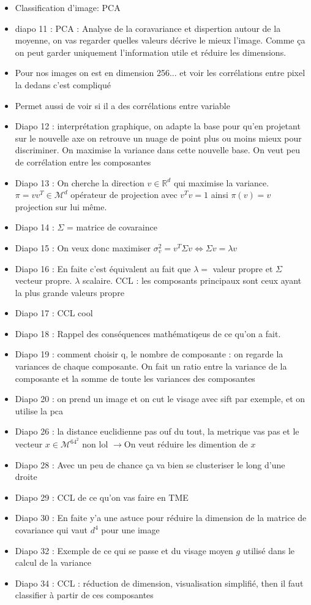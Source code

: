 \documentclass{article}
\theoremstyle{plain}%
\theoremstyle{definition}
\theoremstyle{remark}
\begin{document}
\begin{itemize}
    \item Classification d'image: PCA 
    \item diapo 11 : PCA : Analyse de la coravariance et dispertion autour de la moyenne, on vas regarder quelles valeurs décrive le mieux l'image. Comme ça on peut garder uniquement l'information utile et réduire les dimensions.
    \item Pour nos images on est en dimension 256... et voir les corrélations entre pixel la dedans c'est compliqué 
    \item Permet aussi de voir si il a des corrélations entre variable
    \item Diapo 12 : interprétation graphique, on adapte la base pour qu'en projetant sur le nouvelle axe on retrouve un nuage de point plus ou moins mieux pour discriminer. On maximise la variance dans cette nouvelle base. On veut peu de corrélation entre les composantes 
    \item Diapo 13 : On cherche la direction $ v \in \mathbb{R}^d$ qui maximise la variance. $ \pi = v v^T \in \mathcal{M}^d $ opérateur de projection avec $ v^T v = 1 $ ainsi $ \pi (v) = v $  projection sur lui même.
    \item Diapo 14 : $ \Sigma  $ = matrice de covaraince 
    \item Diapo 15 : On veux donc maximiser $ \sigma _v ^2 = v^T \Sigma v \Leftrightarrow \Sigma v = \lambda v$ 
    \item Diapo 16 : En faite c'est équivalent au fait que $ \lambda  = $ valeur propre et $ \Sigma  $ vecteur propre. $ \lambda  $ scalaire. CCL : les composants principaux sont ceux ayant la plus grande valeurs propre 
    \item Diapo 17 : CCL cool
    \item Diapo 18 : Rappel des conséquences mathématiqeus de ce qu'on a fait.
    \item Diapo 19 : comment choisir q, le nombre de composante : on regarde la variances de chaque composante. On fait un ratio entre la variance de la composante et la somme de toute les variances des composantes
    \item Diapo 20 : on prend un image et on cut le visage avec sift par exemple, et on utilise la pca
    \item Diapo 26 : la distance euclidienne pas ouf du tout, la metrique vas pas et le vecteur $ x \in \mathcal{M}^{64^2} $ non lol $\rightarrow$On veut réduire les dimention de $ x $ 
    \item  Diapo 28 : Avec un peu de chance ça va bien se clusteriser le long d'une droite
    \item Diapo 29 : CCL de ce qu'on vas faire en TME
    \item Diapo 30 : En faite y'a une astuce pour réduire la dimension de la matrice de covariance qui vaut $ d^4 $ pour une image 
    \item Diapo 32 : Exemple de ce qui se passe et du visage moyen $ g $ utilisé dans le calcul de la variance 
    \item Diapo 34 : CCL : réduction de dimension, visualisation simplifié, then il faut classifier à partir de ces composantes
\end{itemize}
\end{document}
